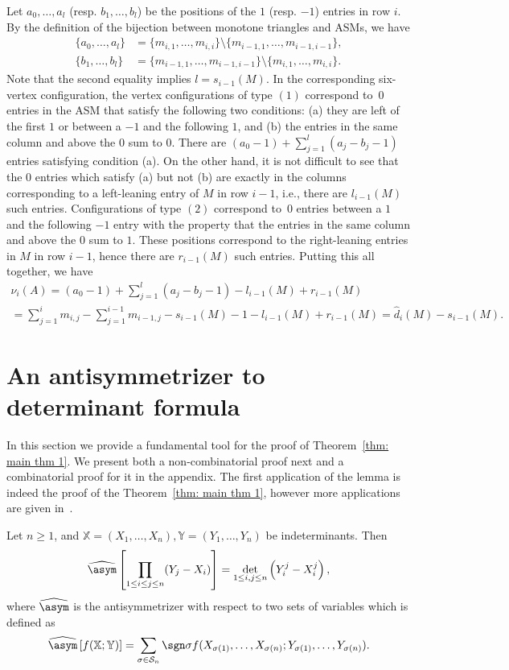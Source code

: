 Let $a_0,\ldots,a_l$ (resp. $b_1,\ldots,b_l$) be the positions of the $1$ (resp. $-1$) entries in row $i$. By the definition of the bijection between monotone triangles and ASMs, we have
\begin{align*}
\{a_0,\ldots,a_l\} &= \{m_{i,1}, \ldots ,m_{i,i} \} \setminus \{ m_{i-1,1}, \ldots , m_{i-1,i-1}\},\\
\{b_1,\ldots,b_l\} &= \{ m_{i-1,1}, \ldots , m_{i-1,i-1}\} \setminus \{m_{i,1}, \ldots ,m_{i,i} \}.
\end{align*}
Note that the second equality implies $l=s_{i-1}(M)$.
In the corresponding six-vertex configuration, the vertex configurations of type $(1)$ correspond to~$0$ entries in the ASM that satisfy the following two conditions: (a) they are left of the first $1$ or between a $-1$ and the following $1$, and (b) the entries in the same column and above the $0$ sum to $0$. There are $(a_0-1) + \sum_{j=1}^l (a_j-b_j-1)$ entries satisfying condition (a). On the other hand, it is not difficult to see that the $0$ entries which satisfy (a) but not (b) are exactly in the columns corresponding to a left-leaning entry of $M$ in row $i-1$, i.e., there are $l_{i-1}(M)$ such entries. Configurations of type $(2)$ correspond to~$0$ entries between a $1$ and the following $-1$ entry with the property that the entries in the same column and above the $0$ sum to $1$. These positions correspond to the right-leaning entries in $M$ in row $i-1$, hence there are $r_{i-1}(M)$ such entries. Putting this all together, we have
\begin{multline*}
\nu_i(A) = (a_0-1) + \sum_{j=1}^l (a_j-b_j-1)  - l_{i-1}(M) + r_{i-1}(M)\\
= \sum_{j=1}^i m_{i,j} - \sum_{j=1}^{i-1} m_{i-1,j}  -s_{i-1}(M)-1- l_{i-1}(M) + r_{i-1}(M)
=\widehat{d}_i(M)  -s_{i-1}(M).
\end{multline*}

\section{An antisymmetrizer to determinant formula}
\label{sec: antisym to det}
In this section we provide a fundamental tool for the proof of Theorem~\ref{thm: main thm 1}. We present both a non-combinatorial proof next and a combinatorial proof for it in the appendix. The first 
application of the lemma is indeed the proof of the Theorem~\ref{thm: main thm 1}, however 
more applications are given in~\cite{FH2022,FischerSchreierAigner23}.

\begin{lemm}  
\label{lem: general}
Let $n \ge 1$, and $\mathbb{X}=(X_1,\ldots,X_n), \mathbb{Y}=(Y_1,\ldots,Y_n)$ be indeterminants.
 Then
\[
\widehat{\asym}  \left[  \prod_{1 \le i \le j \le n} (Y_j-X_i)     \right]
= \det_{1 \le i, j \le n} \left( Y_i^j - X_i^j \right),
\]
where $\widehat{\asym}$ is the antisymmetrizer with respect to two sets of variables which is defined as
\[
\widehat{\asym} \left[f(\mathbb{X};\mathbb{Y})\right] = \sum_{\sigma \in {\mathcal{S}_n}} \sgn \sigma f(X_{\sigma(1)},\ldots,X_{\sigma(n)};Y_{\sigma(1)},\ldots,Y_{\sigma(n)}).
\] 
\end{lemm}

